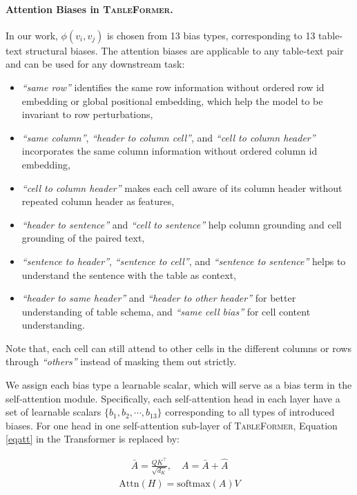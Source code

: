 \documentclass[11pt]{article}
\begin{document}
\paragraph{Attention Biases in \textsc{TableFormer}.}
\label{bias-sec}
In our work, $\phi (v_i, v_j)$ is chosen from 13 bias types, corresponding to 13 table-text structural biases. The attention biases are applicable to any table-text pair and can be used for any downstream task:
\begin{itemize}
    \item \emph{``same row''} identifies the same row information without ordered row id embedding or global positional embedding, which help the model to be invariant to row perturbations,
    \item \emph{``same column''}, \emph{``header to column cell''}, and \emph{``cell to column header''} incorporates the same column information without ordered column id embedding,
    \item \emph{``cell to column header''} makes each cell aware of its column header without repeated column header as features,
    \item  \emph{``header to sentence''} and \emph{``cell to sentence''} help column grounding and cell grounding of the paired text,
    \item \emph{``sentence to header''}, \emph{``sentence to cell''}, and \emph{``sentence to sentence''} helps to understand the sentence with the table as context,
    \item  \emph{``header to same header''} and \emph{``header to other header''} for better understanding of table schema, and \emph{``same cell bias''} for cell content understanding.
\end{itemize}
 Note that, each cell can still attend to other cells in the different columns or rows through \emph{``others''} instead of masking them out strictly. 

We assign each bias type a learnable scalar, which will serve as a bias term in the self-attention module. Specifically, each self-attention head in each layer have a set of learnable scalars $\{b_1, b_2, \cdots, b_{13}\}$ corresponding to all types of introduced biases. For one head in one self-attention sub-layer of \textsc{TableFormer}, Equation \ref{eqatt} in the Transformer is replaced by:

\begin{equation}
\label{eqtatt}
\begin{aligned}
\bar{A} = \frac{QK^\top}{\sqrt{d_K}},  \quad A = \bar{A} + \hat{A}
\end{aligned}
\end{equation}
\begin{equation}
\begin{aligned}
\text{Attn}(H) = \text{softmax} (A)V
\end{aligned}
\end{equation}
\end{document}

